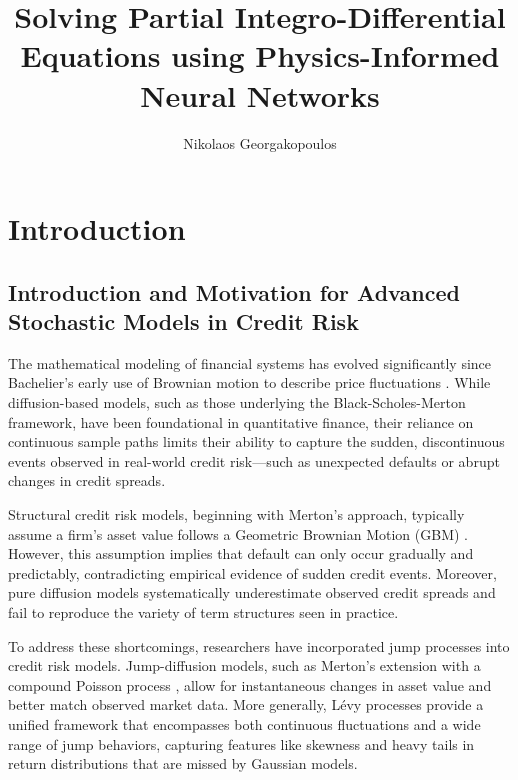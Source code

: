 \documentclass[11pt,twoside,openright]{report}
\title{Solving Partial Integro-Differential Equations using Physics-Informed Neural Networks}
\author{Nikolaos Georgakopoulos}
\date{\the\year{}}
\begin{document}
\doublespacing



\maketitle








\chapter{Introduction}
\label{chap:intro_levy_credit}

\section{Introduction and Motivation for Advanced Stochastic Models in Credit Risk}
\label{sec:intro_chapter1}

The mathematical modeling of financial systems has evolved significantly since Bachelier's early use of Brownian motion to describe price fluctuations \cite{bachelier1900theorie}. While diffusion-based models, such as those underlying the Black-Scholes-Merton framework, have been foundational in quantitative finance, their reliance on continuous sample paths limits their ability to capture the sudden, discontinuous events observed in real-world credit risk—such as unexpected defaults or abrupt changes in credit spreads.

Structural credit risk models, beginning with Merton's approach, typically assume a firm's asset value follows a Geometric Brownian Motion (GBM) \cite{merton1974pricing}. However, this assumption implies that default can only occur gradually and predictably, contradicting empirical evidence of sudden credit events. Moreover, pure diffusion models systematically underestimate observed credit spreads and fail to reproduce the variety of term structures seen in practice.

To address these shortcomings, researchers have incorporated jump processes into credit risk models. Jump-diffusion models, such as Merton's extension with a compound Poisson process \cite{merton1976option}, allow for instantaneous changes in asset value and better match observed market data. More generally, Lévy processes provide a unified framework that encompasses both continuous fluctuations and a wide range of jump behaviors, capturing features like skewness and heavy tails in return distributions that are missed by Gaussian models.
\end{document}
